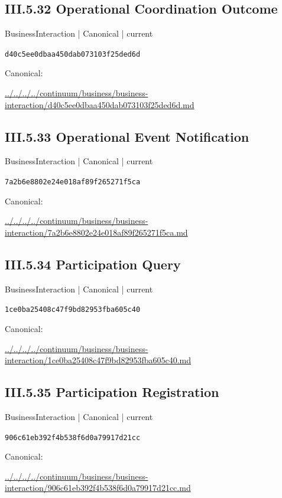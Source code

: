 \documentclass[10pt,a4paper]{article}
\begin{document}
\subsection*{III.5.32 Operational Coordination Outcome}
\label{element-d40c5ee0dbaa450dab073103f25ded6d}
{\small BusinessInteraction | Canonical | current}\par
\texttt{d40c5ee0dbaa450dab073103f25ded6d}\par
Canonical: \par
{\footnotesize\url{../../../../continuum/business/business-interaction/d40c5ee0dbaa450dab073103f25ded6d.md}}\par
\subsection*{III.5.33 Operational Event Notification}
\label{element-7a2b6e8802e24e018af89f265271f5ca}
{\small BusinessInteraction | Canonical | current}\par
\texttt{7a2b6e8802e24e018af89f265271f5ca}\par
Canonical: \par
{\footnotesize\url{../../../../continuum/business/business-interaction/7a2b6e8802e24e018af89f265271f5ca.md}}\par
\subsection*{III.5.34 Participation Query}
\label{element-1ce0ba25408c47f9bd82953fba605c40}
{\small BusinessInteraction | Canonical | current}\par
\texttt{1ce0ba25408c47f9bd82953fba605c40}\par
Canonical: \par
{\footnotesize\url{../../../../continuum/business/business-interaction/1ce0ba25408c47f9bd82953fba605c40.md}}\par
\subsection*{III.5.35 Participation Registration}
\label{element-906c61eb392f4b538f6d0a79917d21cc}
{\small BusinessInteraction | Canonical | current}\par
\texttt{906c61eb392f4b538f6d0a79917d21cc}\par
Canonical: \par
{\footnotesize\url{../../../../continuum/business/business-interaction/906c61eb392f4b538f6d0a79917d21cc.md}}\par
\end{document}

